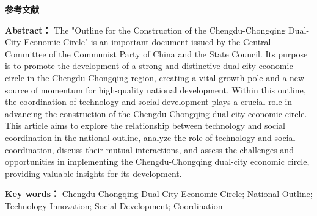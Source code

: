 \documentclass{CjC}
\begin{document}
\begingroup
\renewcommand{\section}[2]{}
\noindent\textbf{参考文献}


\endgroup


\newpage
\begin{center}


\vspace{10pt}


\vspace{10pt}

\end{center}

\textbf{Abstract：} The "Outline for the Construction of the Chengdu-Chongqing Dual-City Economic Circle" is an important document issued by the Central Committee of the Communist Party of China and the State Council. Its purpose is to promote the development of a strong and distinctive dual-city economic circle in the Chengdu-Chongqing region, creating a vital growth pole and a new source of momentum for high-quality national development. Within this outline, the coordination of technology and social development plays a crucial role in advancing the construction of the Chengdu-Chongqing dual-city economic circle. This article aims to explore the relationship between technology and social coordination in the national outline, analyze the role of technology and social coordination, discuss their mutual interactions, and assess the challenges and opportunities in implementing the Chengdu-Chongqing dual-city economic circle, providing valuable insights for its development. 

\textbf{Key words：} Chengdu-Chongqing Dual-City Economic Circle; National Outline; Technology Innovation; Social Development; Coordination
\end{document}
